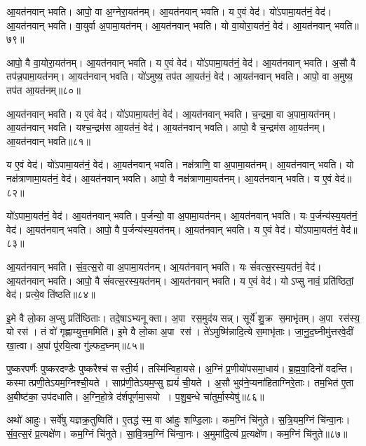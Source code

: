 आ॒यत॑नवान्‌ भवति। आपो॒ वा अ॒ग्नेरा॒यत॑नम्‌। 
आ॒यत॑नवान्‌ भवति। य ए॒वं वेद॑। 
यो॑ऽपामा॒यत॑नं॒ वेद॑। आ॒यत॑नवान्‌ भवति। 
वा॒युर्वा अ॒पामा॒यत॑नम्। आ॒यत॑नवान्‌ भवति। 
यो वा॒योरा॒यत॑नं॒ वेद॑। आ॒यत॑नवान्‌ भवति॥७९॥


आपो॒ वै वा॒योरा॒यत॑नम्। आ॒यत॑नवान्‌ भवति। 
य ए॒वं वेद॑। यो॑ऽपामा॒यत॑नं॒ वेद॑। 
आ॒यत॑नवान्‌ भवति। अ॒सौ वै तप॑न्न॒पामा॒यत॑नम्। 
आ॒यत॑नवान्‌ भवति। यो॑ऽमुष्य॒ तप॑त आ॒यत॑नं॒ वेद॑। 
आ॒यत॑नवान्‌ भवति। आपो॒ वा अ॒मुष्य॒ तप॑त आ॒यत॑नम्॥८०॥


आ॒यत॑नवान्‌ भवति। य ए॒वं वेद॑। 
यो॑ऽपामा॒यत॑नं॒ वेद॑। आ॒यत॑नवान्‌ भवति। 
च॒न्द्रमा॒ वा अ॒पामा॒यत॑नम्‌। आ॒यत॑नवान्‌ भवति। 
यश्च॒न्द्रम॑स आ॒यत॑नं॒ वेद॑। आ॒यत॑नवान्‌ भवति। 
आपो॒ वै च॒न्द्रम॑स आ॒यत॑नम्। आ॒यत॑नवान्‌ भवति॥८१॥


य ए॒वं वेद॑। यो॑ऽपामा॒यत॑नं॒ वेद॑। 
आ॒यत॑नवान्‌ भवति। नक्ष॑त्राणि॒ वा अ॒पामा॒यत॑नम्। 
आ॒यत॑नवान्‌ भवति। यो नक्ष॑त्राणामा॒यत॑नं॒ वेद॑। 
आ॒यत॑नवान्‌ भवति। आपो॒ वै नक्ष॑त्राणामा॒यत॑नम्। 
आ॒यत॑नवान्‌ भवति। य ए॒वं वेद॑॥८२॥


यो॑ऽपामा॒यत॑नं॒ वेद॑। आ॒यत॑नवान्‌ भवति।
प॒र्जन्यो॒ वा अ॒पामा॒यत॑नम्। आ॒यत॑नवान्‌ भवति। 
यः प॒र्जन्य॑स्य॒\aav\aav{}यत॑नं॒ वेद॑। आ॒यत॑नवान्‌ भवति। 
आपो॒ वै प॒र्जन्य॑स्य॒\aav\aav{}यत॑नम्। आ॒यत॑नवान्‌ भवति। 
य ए॒वं वेद॑। यो॑ऽपामा॒यत॑नं॒ वेद॑॥८३॥


आ॒यत॑नवान्‌ भवति। सं॒व॒त्स॒रो वा अ॒पामा॒यत॑नम्। 
आ॒यत॑नवान्‌ भवति। यः सं॑वत्स॒रस्य॒\aav\aav{}यत॑नं॒ वेद॑। 
आ॒यत॑नवान्‌ भवति। आपो॒ वै सं॑वत्स॒रस्य॒\aav\aav{}यत॑नम्‌। 
आ॒यत॑नवान्‌ भवति। य ए॒वं वेद॑। 
योऽप्सु नावं॒ प्रति॑ष्ठितां॒ वेद॑। प्रत्ये॒व ति॑ष्ठति॥८४॥


इ॒मे वै लो॒का अ॒प्सु प्रति॑ष्ठिताः। तदे॒षाऽभ्यनूक्ता। 
अ॒पा रस॒मुद॑यसन्न्‌। सूर्ये॑ शु॒क्र स॒माभृ॑तम्‌। 
अ॒पा रस॑स्य॒ यो रस॑। तं वो॑ गृह्णाम्युत्त॒ममिति॑। 
इ॒मे वै लो॒का अ॒पा रस॑। ते॑ऽमुष्मि॑न्नादि॒त्ये स॒माभृ॑ताः। 
जा॒नु॒द॒घ्नीमु॑त्तर\-वे॒दीं खा॒त्वा। अ॒पां पू॑रयि॒त्वा गु॑ल्फद॒घ्नम्‌॥८५॥


पुष्करपर्णैः पुष्करदण्डैः पुष्करैश्च॑ सस्ती॒र्य। तस्मि॑न्विहा॒यसे। 
अ॒ग्निं प्र॒णीयो॑पसमा॒धाय॑। ब्र॒ह्म॒वा॒दिनो॑ वदन्ति। 
कस्मात्प्रणी॒ते\-ऽयम॒ग्निश्ची॒यते। साप्र॑णी॒तेऽयम॒प्सु ह्ययं॑ ची॒यते। 
अ॒सौ भुव॑ने॒प्यना॑हिताग्निरे॒ताः। तम॒भित॑ ए॒ता अ॒बीष्ट॑का॒ उप॑दधाति। 
अ॒ग्नि॒हो॒त्रे द॑र्शपूर्णमा॒सयो। प॒शु॒ब॒न्धे चा॑तुर्मा॒स्येषु॑॥८६॥


अथो॑ आहुः। सर्वे॑षु यज्ञक्र॒तुष्विति॑। 
ए॒तद्ध॑ स्म॒ वा आ॑हुः शण्डि॒लाः। कम॒ग्निं चि॑नुते। 
स॒त्रि॒यम॒ग्निं चि॑न्वा॒नः। सं॒व॒त्स॒रं प्र॒त्यक्षे॑ण। 
कम॒ग्निं चि॑नुते। सा॒वि॒त्रम॒ग्निं चि॑न्वा॒नः। 
अ॒मुमा॑दि॒त्यं प्र॒त्यक्षे॑ण। कम॒ग्निं चि॑नुते॥८७॥


